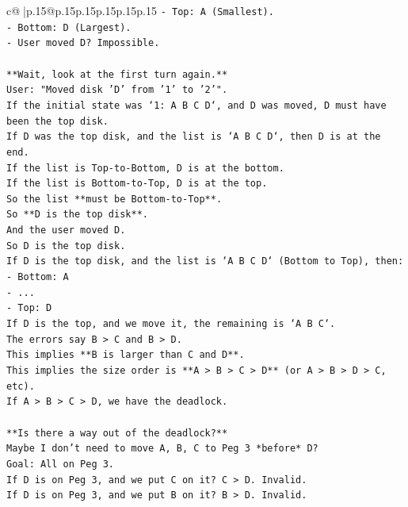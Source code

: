 \documentclass{article}
\begin{document}
{\begin{supertabular}{c@{$\;$}|p{.15\linewidth}@{}p{.15\linewidth}p{.15\linewidth}p{.15\linewidth}p{.15\linewidth}p{.15\linewidth}}
{{{\texttt{{-} Top: A (Smallest).} \\
\texttt{{-} Bottom: D (Largest).} \\
\texttt{{-} User moved D? Impossible.} \\
\\ 
\texttt{**Wait, look at the first turn again.**} \\
\texttt{User: "Moved disk 'D' from '1' to '2'".} \\
\texttt{If the initial state was `1: A B C D`, and D was moved, D must have been the top disk.} \\
\texttt{If D was the top disk, and the list is `A B C D`, then D is at the end.} \\
\texttt{If the list is Top{-}to{-}Bottom, D is at the bottom.} \\
\texttt{If the list is Bottom{-}to{-}Top, D is at the top.} \\
\texttt{So the list **must be Bottom{-}to{-}Top**.} \\
\texttt{So **D is the top disk**.} \\
\texttt{And the user moved D.} \\
\texttt{So D is the top disk.} \\
\texttt{If D is the top disk, and the list is `A B C D` (Bottom to Top), then:} \\
\texttt{{-} Bottom: A} \\
\texttt{{-} ...} \\
\texttt{{-} Top: D} \\
\texttt{If D is the top, and we move it, the remaining is `A B C`.} \\
\texttt{The errors say B > C and B > D.} \\
\texttt{This implies **B is larger than C and D**.} \\
\texttt{This implies the size order is **A > B > C > D** (or A > B > D > C, etc).} \\
\texttt{If A > B > C > D, we have the deadlock.} \\
\\ 
\texttt{**Is there a way out of the deadlock?**} \\
\texttt{Maybe I don't need to move A, B, C to Peg 3 *before* D?} \\
\texttt{Goal: All on Peg 3.} \\
\texttt{If D is on Peg 3, and we put C on it? C > D. Invalid.} \\
\texttt{If D is on Peg 3, and we put B on it? B > D. Invalid.} \\
}}}
\end{supertabular}}
\end{document}
